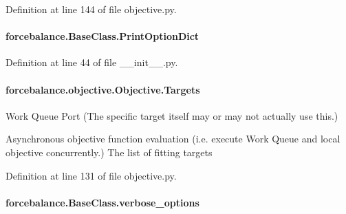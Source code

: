 Definition at line 144 of file objective.\-py.

\hypertarget{classforcebalance_1_1BaseClass_afc6659278497d7245bc492ecf405ccae}{
\paragraph[{Print\-Option\-Dict}]{\setlength{\rightskip}{0pt plus 5cm}forcebalance.\-Base\-Class.\-Print\-Option\-Dict\hspace{0.3cm}{\ttfamily [inherited]}}}\label{classforcebalance_1_1BaseClass_afc6659278497d7245bc492ecf405ccae}


Definition at line 44 of file \-\_\-\-\_\-init\-\_\-\-\_\-.\-py.

\hypertarget{classforcebalance_1_1objective_1_1Objective_a20e0d09fb2b889b5f604e75a020601a8}{
\paragraph[{Targets}]{\setlength{\rightskip}{0pt plus 5cm}forcebalance.\-objective.\-Objective.\-Targets}}\label{classforcebalance_1_1objective_1_1Objective_a20e0d09fb2b889b5f604e75a020601a8}


Work Queue Port (The specific target itself may or may not actually use this.) 

Asynchronous objective function evaluation (i.\-e. execute Work Queue and local objective concurrently.) The list of fitting targets 

Definition at line 131 of file objective.\-py.

\hypertarget{classforcebalance_1_1BaseClass_afd68efa29ccd2f320f4cf82198214aac}{
\paragraph[{verbose\-\_\-options}]{\setlength{\rightskip}{0pt plus 5cm}forcebalance.\-Base\-Class.\-verbose\-\_\-options\hspace{0.3cm}{\ttfamily [inherited]}}}\label{classforcebalance_1_1BaseClass_afd68efa29ccd2f320f4cf82198214aac}


